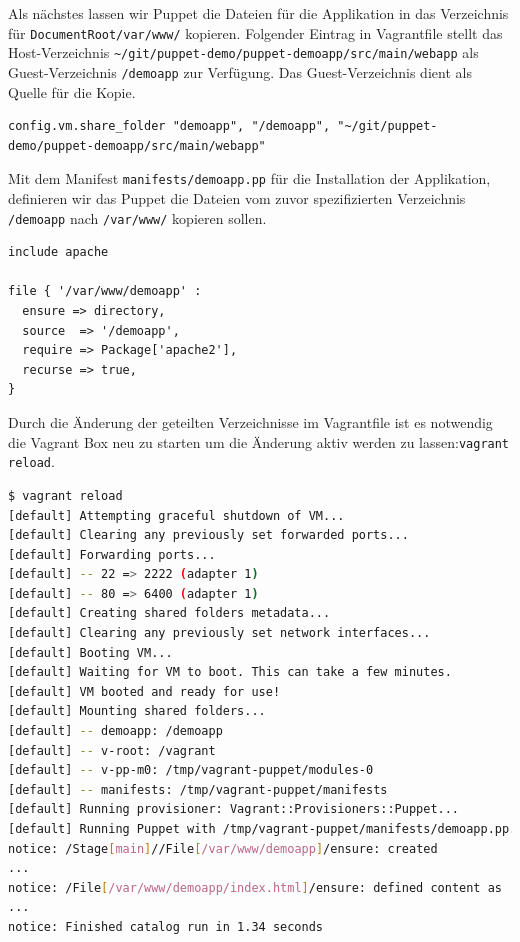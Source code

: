 \documentclass[12pt,a4paper,ngerman]{article}
\begin{document}
Als nächstes lassen wir Puppet die Dateien für die Applikation in das Verzeichnis für \lstinline$DocumentRoot/var/www/$ kopieren. Folgender Eintrag in Vagrantfile stellt das Host-Verzeichnis \lstinline$~/git/puppet-demo/puppet-demoapp/src/main/webapp$ als Guest-Verzeichnis \lstinline$/demoapp$ zur Verfügung. Das Guest-Verzeichnis dient als Quelle für die Kopie.
\begin{lstlisting}[language=vagrant,caption=Shared folders in Vagrantfile konfigurieren, label=vagrantsharedfolder]
config.vm.share_folder "demoapp", "/demoapp", "~/git/puppet-demo/puppet-demoapp/src/main/webapp"
\end{lstlisting}

Mit dem Manifest \lstinline$manifests/demoapp.pp$ für die Installation der Applikation, definieren wir das Puppet die Dateien vom zuvor spezifizierten Verzeichnis \lstinline$/demoapp$ nach \lstinline$/var/www/$ kopieren sollen.
\begin{lstlisting}[language=puppet,caption=Puppet Manifest für die Applikation, label=puppetdemoapp]
include apache

file { '/var/www/demoapp' :
  ensure => directory,
  source  => '/demoapp',
  require => Package['apache2'],
  recurse => true,
}
\end{lstlisting}

Durch die Änderung der geteilten Verzeichnisse im Vagrantfile ist es notwendig die Vagrant Box neu zu starten um die Änderung aktiv werden zu lassen:\lstinline$vagrant reload$.
\begin{lstlisting}[language=sh,caption=Puppet reload mit Provisioning der Applikation, label=reloaddemoapp]
$ vagrant reload
[default] Attempting graceful shutdown of VM...
[default] Clearing any previously set forwarded ports...
[default] Forwarding ports...
[default] -- 22 => 2222 (adapter 1)
[default] -- 80 => 6400 (adapter 1)
[default] Creating shared folders metadata...
[default] Clearing any previously set network interfaces...
[default] Booting VM...
[default] Waiting for VM to boot. This can take a few minutes.
[default] VM booted and ready for use!
[default] Mounting shared folders...
[default] -- demoapp: /demoapp
[default] -- v-root: /vagrant
[default] -- v-pp-m0: /tmp/vagrant-puppet/modules-0
[default] -- manifests: /tmp/vagrant-puppet/manifests
[default] Running provisioner: Vagrant::Provisioners::Puppet...
[default] Running Puppet with /tmp/vagrant-puppet/manifests/demoapp.pp...
notice: /Stage[main]//File[/var/www/demoapp]/ensure: created
...
notice: /File[/var/www/demoapp/index.html]/ensure: defined content as '{md5}90a8d419b9c7b43b09ba73abebaf8f4c'
...
notice: Finished catalog run in 1.34 seconds
\end{lstlisting}
\end{document}
